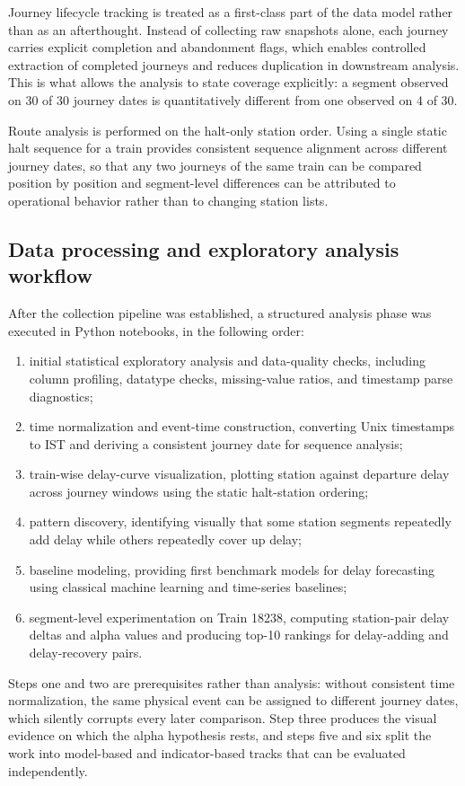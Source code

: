 \documentclass[a4paper,fleqn]{cas-dc}
\begin{document}
Journey lifecycle tracking is treated as a first-class part of the data model
rather than as an afterthought. Instead of collecting raw snapshots alone,
each journey carries explicit completion and abandonment flags, which enables
controlled extraction of completed journeys and reduces duplication in
downstream analysis. This is what allows the analysis to state coverage
explicitly: a segment observed on 30 of 30 journey dates is quantitatively
different from one observed on 4 of 30.

Route analysis is performed on the halt-only station order. Using a single
static halt sequence for a train provides consistent sequence alignment across
different journey dates, so that any two journeys of the same train can be
compared position by position and segment-level differences can be attributed
to operational behavior rather than to changing station lists.

\subsection{Data processing and exploratory analysis workflow}
After the collection pipeline was established, a structured analysis phase was
executed in Python notebooks, in the following order:
\begin{enumerate}
    \item initial statistical exploratory analysis and data-quality checks,
          including column profiling, datatype checks, missing-value ratios,
          and timestamp parse diagnostics;
    \item time normalization and event-time construction, converting Unix
          timestamps to IST and deriving a consistent journey date for
          sequence analysis;
    \item train-wise delay-curve visualization, plotting station against
          departure delay across journey windows using the static
          halt-station ordering;
    \item pattern discovery, identifying visually that some station segments
          repeatedly add delay while others repeatedly cover up delay;
    \item baseline modeling, providing first benchmark models for delay
          forecasting using classical machine learning and time-series
          baselines;
    \item segment-level experimentation on Train 18238, computing
          station-pair delay deltas and alpha values and producing top-10
          rankings for delay-adding and delay-recovery pairs.
\end{enumerate}
Steps one and two are prerequisites rather than analysis: without consistent
time normalization, the same physical event can be assigned to different
journey dates, which silently corrupts every later comparison. Step three
produces the visual evidence on which the alpha hypothesis rests, and steps
five and six split the work into model-based and indicator-based tracks that
can be evaluated independently.
\end{document}
